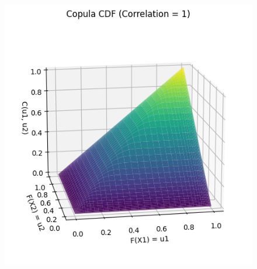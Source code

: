 \begin{example}

\end{example}
    

\begin{figure}
    \centering
    \begin{minipage}{0.45\textwidth}
        \centering
        \includegraphics[width=\textwidth]{3Theory/pictures/TrueCopulaExponential.png}
        \label{fig:TrueCopulaExponential}
    \end{minipage}
    \hfill

\end{figure}
